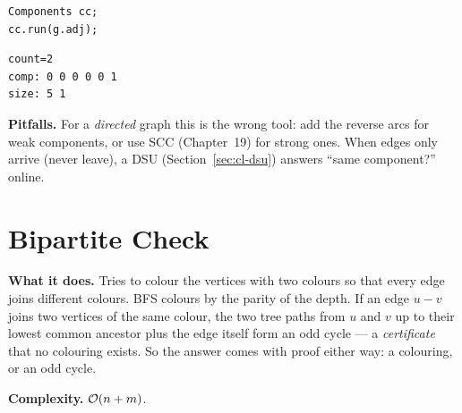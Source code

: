 \begin{lstlisting}[style=snippet]
Components cc;
cc.run(g.adj);
\end{lstlisting}
\begin{lstlisting}[style=trace]
count=2
comp: 0 0 0 0 0 1
size: 5 1
\end{lstlisting}

\textbf{Pitfalls.} For a \emph{directed} graph this is the wrong tool: add the reverse arcs for weak components, or use SCC (Chapter~19) for strong ones. When edges only arrive (never leave), a DSU (Section~\ref{sec:cl-dsu}) answers ``same component?'' online.



\clneed
\section{Bipartite Check}
\label{sec:cl-bipartite}

\textbf{What it does.} Tries to colour the vertices with two colours so that every edge joins different colours. BFS colours by the parity of the depth. If an edge $u{-}v$ joins two vertices of the same colour, the two tree paths from $u$ and $v$ up to their lowest common ancestor plus the edge itself form an odd cycle --- a \emph{certificate} that no colouring exists. So the answer comes with proof either way: a colouring, or an odd cycle.

\textbf{Complexity.} $\mathcal{O}(n+m)$.

\begin{diagrambox}
\end{diagrambox}

